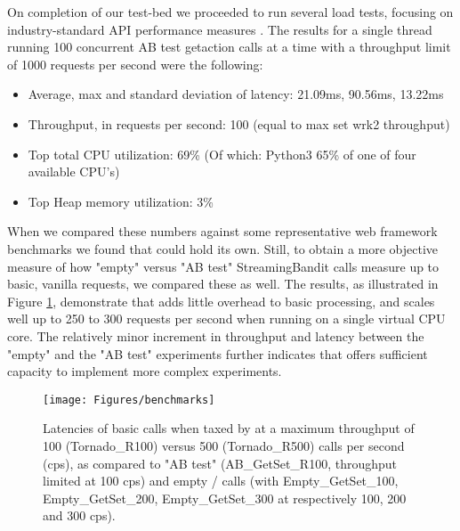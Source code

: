 \documentclass[nojss]{jss}
\begin{document}
On completion of our test-bed we proceeded to run several  load tests, focusing on industry-standard API performance measures \citep{De2017}. The results for a single  thread running 100 concurrent AB test getaction calls at a time with a throughput limit of 1000 requests per second were the following:

\begin{itemize}
  \item Average, max and standard deviation of latency: 21.09ms, 90.56ms, 13.22ms
  \item Throughput, in requests per second: 100 (equal to max set wrk2 throughput)
  \item Top total CPU utilization: 69\% (Of which: Python3 65\% of one of four available CPU's)
  \item Top Heap memory utilization: 3\%
\end{itemize}

When we compared these numbers against some representative  web framework benchmarks \citep{Klenov2015} we found that  could hold its own. Still, to obtain a more objective measure of how "empty" versus "AB test" StreamingBandit  calls measure up to basic, vanilla  requests, we compared these as well. The results, as illustrated in Figure \ref{fig:benchmarks}, demonstrate that  adds little overhead to basic  processing, and scales well up to 250 to 300 requests per second when running on a single virtual CPU core. The relatively minor increment in throughput and latency between the "empty" and the "AB test" experiments further indicates that  offers sufficient capacity to implement more complex experiments.

\begin{figure}[htp!]
  \centering
    \texttt{[image: Figures/benchmarks]}

      \caption{Latencies of basic  calls when taxed by  at a maximum throughput of 100 (Tornado\_R100) versus 500 (Tornado\_R500) calls per second (cps), as compared to  "AB test" (AB\_GetSet\_R100, throughput limited at 100 cps) and empty / calls (with Empty\_GetSet\_100, Empty\_GetSet\_200, Empty\_GetSet\_300 at respectively 100, 200 and 300 cps).}
    \label{fig:benchmarks}
\end{figure}
\end{document}
